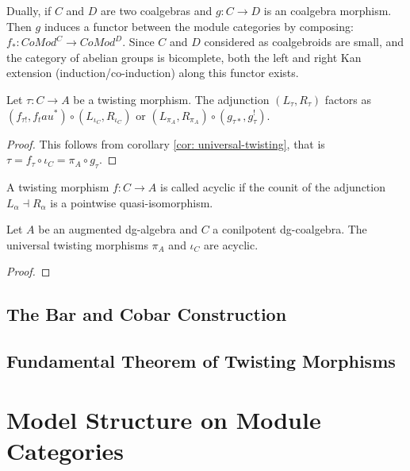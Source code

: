 \documentclass[../thesis.tex]{subfiles}
\begin{document}
            Dually, if $C$ and $D$ are two coalgebras and $g : C \rightarrow D$ is an coalgebra morphism. Then $g$ induces a functor between the module categories by composing: $f_* : CoMod^C \rightarrow CoMod^D$. Since $C$ and $D$ considered as coalgebroids are small, and the category of abelian groups is bicomplete, both the left and right Kan extension (induction/co-induction) along this functor exists.
            \begin{center}
            \end{center}

            \begin{lemma}
                Let $\tau : C \rightarrow A$ be a twisting morphism. The adjunction $(L_\tau, R_\tau)$ factors as $(f_{\tau !}, f_tau^*)\circ (L_{\iota_C},R_{\iota_C})$ or $(L_{\pi_A},R_{\pi_A})\circ (g_{\tau *}, g_\tau^!)$.
            \end{lemma}

            \begin{proof}
                This follows from corollary \ref{cor: universal-twisting}, that is $\tau = f_\tau \circ \iota_C = \pi_A\circ g_\tau$.
            \end{proof}

            \begin{definition}
                A twisting morphism $f: C \rightarrow A$ is called acyclic if the counit of the adjunction $L_\alpha \dashv R_\alpha$ is a pointwise quasi-isomorphism.
            \end{definition}

            \begin{lemma}
                Let $A$ be an augmented dg-algebra and $C$ a conilpotent dg-coalgebra. The universal twisting morphisms $\pi_A$ and $\iota_C$ are acyclic.
            \end{lemma}

            \begin{proof}
                
            \end{proof}

        \subsection{The Bar and Cobar Construction}

        \subsection{Fundamental Theorem of Twisting Morphisms}

    \section{Model Structure on Module Categories}
\end{document}
